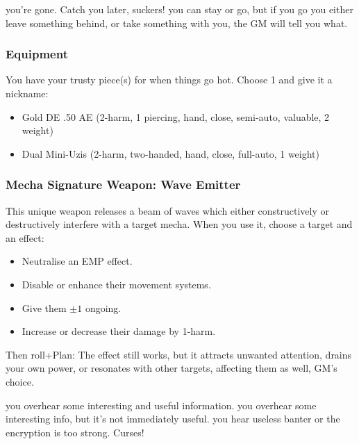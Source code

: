 {you're gone. Catch you later, suckers!}
{you can stay or go, but if you go you either leave something behind, or take something with you, the GM will tell you what.}

\subsubsection{Equipment}
You have your trusty piece(s) for when things go hot. Choose 1 and give it a nickname:
\begin{itemize}
\item Gold DE .50 AE (2-harm, 1 piercing, hand, close, semi-auto, valuable, 2 weight)
\item Dual Mini-Uzis (2-harm, two-handed, hand, close, full-auto, 1 weight) 
\end{itemize}

\subsubsection{Mecha Signature Weapon: Wave Emitter}
This unique weapon releases a beam of waves which either constructively or destructively interfere with a target mecha. When you use it, choose a target and an effect:
\begin{itemize}
\item Neutralise an EMP effect.
\item Disable or enhance their movement systems.
\item Give them $\pm 1$ ongoing.
\item Increase or decrease their damage by 1-harm.
\end{itemize}
Then roll+Plan:
{The effect still works, but it attracts unwanted attention, drains your own power, or resonates with other targets, affecting them as well, GM's choice.}

{you overhear some interesting and useful information.}
{you overhear some interesting info, but it's not immediately useful.}
{you hear useless banter or the encryption is too strong. Curses!}



